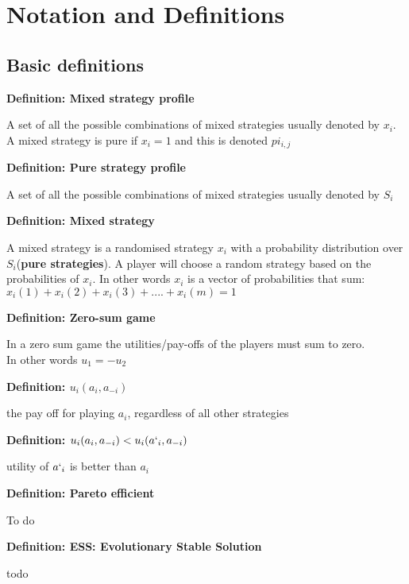 \documentclass[11pt]{report}
\newcommand{\define}[2] {
  \textbf{Definition: #1}
  \begin{center} #2
\end{center}
}
\begin{document}
\chapter{Notation and Definitions }

\section{Basic definitions}
\define{Mixed strategy profile}{A set of all the possible combinations of mixed strategies usually denoted by $x_{i}$. A mixed strategy is pure if $x_{i} = 1$ and this is denoted $pi_{i, j}$}
\define{Pure strategy profile}{A set of all the possible combinations of mixed strategies usually denoted by $S_{i}$}
\define{Mixed strategy}{ A mixed strategy is a randomised strategy $x_i$ with a probability distribution over $S_i$(\textbf{pure strategies}). A player will choose a random strategy based on the probabilities of $x_{i}$. In other words $x_{i}$ is a vector of probabilities that sum: \\ $x_{i}(1) + x_{i}(2) + x_{i}(3) + .... + x_{i}(m) = 1$ }
\define{Zero-sum game}{In a zero sum game the utilities/pay-offs of the players must sum to zero. \\ In other words $u_{1} = -u_{2}$}
\define{$u_{i}(a_{i}, a_{-i})$}{the pay off for playing $a_{i}$, regardless of all other strategies}
\define{$u_{i}(a_{i}, a_{-i}) < u_{i}(a`_{i}, a_{-i})$}{utility of $a`_{i}$ is better than $a_{i}$}
\define{Pareto efficient}{To do}
\define{ESS: Evolutionary Stable Solution}{todo}
\end{document}
